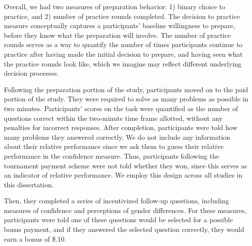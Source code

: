 \documentclass[letterpaper, nobind]{templates/ociamthesis}
\begin{document}
Overall, we had two measures of preparation behavior: 1) binary choice to practice, and 2) number of practice rounds completed. The decision to practice measure conceptually captures a participants' baseline willingness to prepare, before they know what the preparation will involve. The number of practice rounds serves as a way to quantify the number of times participants continue to practice after having made the initial decision to prepare, and having seen what the practice rounds look like, which we imagine may reflect different underlying decision processes.

Following the preparation portion of the study, participants moved on to the paid portion of the study. They were required to solve as many problems as possible in two minutes. Participants' scores on the task were quantified as the number of questions correct within the two-minute time frame allotted, without any penalties for incorrect responses. After completion, participants were told how many problems they answered correctly. We do not include any information about their relative performance since we ask them to guess their relative performance in the confidence measure. Thus, participants following the tournament payment scheme were not told whether they won, since this serves as an indicator of relative performance. We employ this design across all studies in this dissertation.

Then, they completed a series of incentivized follow-up questions, including measures of confidence and perceptions of gender differences. For these measures, participants were told one of these questions would be selected for a possible bonus payment, and if they answered the selected question correctly, they would earn a bonus of \$.10.
\end{document}
